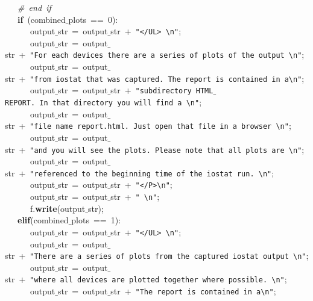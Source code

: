 \mbox{}\ \ \ \textit{\#\ end\ if} \\
\mbox{}\ \ \ \textbf{if}\ (combined$\_$plots\ ==\ 0): \\
\mbox{}\ \ \ \ \ \ output$\_$str\ =\ output$\_$str\ +\ \texttt{"{}\textless{}/UL\textgreater{}\ \textbackslash{}n"{}}; \\
\mbox{}\ \ \ \ \ \ output$\_$str\ =\ output$\_$str\ +\ \texttt{"{}For\ each\ devices\ there\ are\ a\ series\ of\ plots\ of\ the\ output\ \textbackslash{}n"{}}; \\
\mbox{}\ \ \ \ \ \ output$\_$str\ =\ output$\_$str\ +\ \texttt{"{}from\ iostat\ that\ was\ captured.\ The\ report\ is\ contained\ in\ a\textbackslash{}n"{}}; \\
\mbox{}\ \ \ \ \ \ output$\_$str\ =\ output$\_$str\ +\ \texttt{"{}subdirectory\ HTML$\_$REPORT.\ In\ that\ directory\ you\ will\ find\ a\ \textbackslash{}n"{}}; \\
\mbox{}\ \ \ \ \ \ output$\_$str\ =\ output$\_$str\ +\ \texttt{"{}file\ name\ report.html.\ Just\ open\ that\ file\ in\ a\ browser\ \textbackslash{}n"{}}; \\
\mbox{}\ \ \ \ \ \ output$\_$str\ =\ output$\_$str\ +\ \texttt{"{}and\ you\ will\ see\ the\ plots.\ Please\ note\ that\ all\ plots\ are\ \textbackslash{}n"{}}; \\
\mbox{}\ \ \ \ \ \ output$\_$str\ =\ output$\_$str\ +\ \texttt{"{}referenced\ to\ the\ beginning\ time\ of\ the\ iostat\ run.\ \textbackslash{}n"{}}; \\
\mbox{}\ \ \ \ \ \ output$\_$str\ =\ output$\_$str\ +\ \texttt{"{}\textless{}/P\textgreater{}\textbackslash{}n"{}}; \\
\mbox{}\ \ \ \ \ \ output$\_$str\ =\ output$\_$str\ +\ \texttt{"{}\ \textbackslash{}n"{}}; \\
\mbox{}\ \ \ \ \ \ f.\textbf{write}(output$\_$str); \\
\mbox{}\ \ \ \textbf{elif}(combined$\_$plots\ ==\ 1): \\
\mbox{}\ \ \ \ \ \ output$\_$str\ =\ output$\_$str\ +\ \texttt{"{}\textless{}/UL\textgreater{}\ \textbackslash{}n"{}}; \\
\mbox{}\ \ \ \ \ \ output$\_$str\ =\ output$\_$str\ +\ \texttt{"{}There\ are\ a\ series\ of\ plots\ from\ the\ captured\ iostat\ output\ \textbackslash{}n"{}}; \\
\mbox{}\ \ \ \ \ \ output$\_$str\ =\ output$\_$str\ +\ \texttt{"{}where\ all\ devices\ are\ plotted\ together\ where\ possible.\ \textbackslash{}n"{}}; \\
\mbox{}\ \ \ \ \ \ output$\_$str\ =\ output$\_$str\ +\ \texttt{"{}The\ report\ is\ contained\ in\ a\textbackslash{}n"{}}; \\
